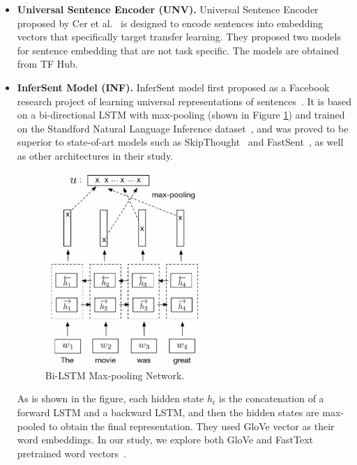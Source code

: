 \documentclass[runningheads]{llncs}
\begin{document}
\begin{itemize}
	After obtaining word embeddings, the sentence embedding is the average of the sum of word vectors in a sentence, or is aligned in a maximizing pattern. To maximize the alignment, each word in sentence 1 is aligned to the most similar word in sentence 2, while each word in sentence 2 is aligned to the most similar word in sentence 1. Then the scores for the alignments in both directions are added and normalized according to sentence length.
	\item \textbf{Universal Sentence Encoder (UNV).} Universal Sentence Encoder proposed by Cer et al.~\cite{cer2018universal} is designed to encode sentences into embedding vectors that specifically target transfer learning. They proposed two models for sentence embedding that are not task specific. The models are obtained from TF Hub.
	\item \textbf{InferSent Model (INF).} InferSent model first proposed as a Facebook research project of learning universal representations of sentences~\cite{conneau2017supervised}. It is based on a bi-directional LSTM with max-pooling (shown in Figure \ref{fig:3}) and trained on the Standford Natural Language Inference dataset~\cite{bowman2015large}, and was proved to be superior to state-of-art models such as SkipThought~\cite{kiros2015skip} and FastSent~\cite{hill2016learning}, as well as other architectures in their study. 
	\begin{figure}[htbp]
		\centering
		\includegraphics[width=6cm]{./3.png}
		\caption{Bi-LSTM Max-pooling Network.}\label{fig:3}
	\end{figure}
	As is shown in the figure, each hidden state $h_t$ is the concatenation of a forward LSTM and a backward LSTM, and then the hidden states are max-pooled to obtain the final representation. They used GloVe vector as their word embeddings. In our study, we explore both GloVe and FastText pretrained word vectors~\cite{pennington2014glove, joulin2017bag}.
\end{itemize}
\end{document}
